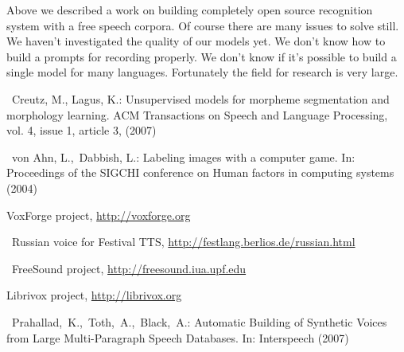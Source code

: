 \documentclass[runningheads]{llncs}
\begin{document}
Above we described a work on building completely open source recognition system
with a free speech corpora. Of course there are many issues to solve still.
We haven't investigated the quality of our models yet. We don't know
how to build a prompts for recording properly. We don't know if it's possible
to build a single model for many languages. Fortunately the field for 
research is very large.

\begin{thebibliography}{4}

 Creutz, M., Lagus, K.: Unsupervised models for morpheme segmentation 
and morphology learning. ACM Transactions on Speech and Language Processing,
vol. 4, issue 1, article 3, (2007)

 von Ahn, L., Dabbish, L.: Labeling images with a computer game. 
In: Proceedings of the SIGCHI conference on Human factors in computing systems (2004)

 VoxForge project, \url{http://voxforge.org}

 Russian voice for Festival TTS, \url{http://festlang.berlios.de/russian.html}

 FreeSound project, \url{http://freesound.iua.upf.edu}

 Librivox project, \url{http://librivox.org}

 Prahallad, K., Toth, A., Black, A.: Automatic Building of Synthetic Voices from 
Large Multi-Paragraph Speech Databases. In: Interspeech (2007)

\end{thebibliography}
\end{document}
